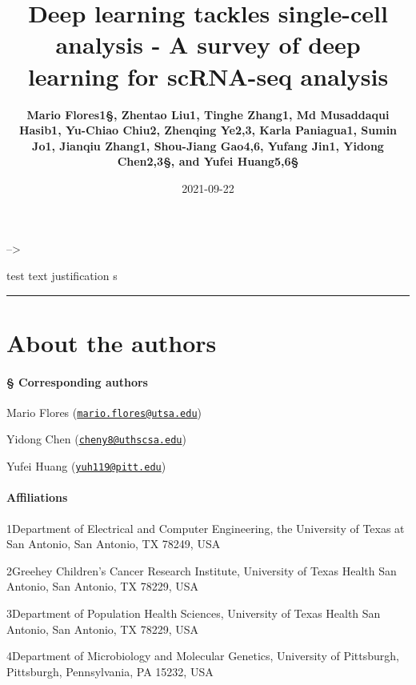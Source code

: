 \documentclass[
]{book}
\title{Deep learning tackles single-cell analysis - A survey of deep learning for scRNA-seq analysis}
\author{\textbf{Mario Flores1§, Zhentao Liu1, Tinghe Zhang1, Md Musaddaqui Hasib1, Yu-Chiao Chiu2, Zhenqing Ye2,3, Karla Paniagua1, Sumin Jo1, Jianqiu Zhang1, Shou-Jiang Gao4,6, Yufang Jin1, Yidong Chen2,3§, and Yufei Huang5,6§}}
\date{2021-09-22}
\begin{document}
\maketitle

{
\setcounter{tocdepth}{1}
\tableofcontents
}
--\textgreater{}

test text justification
s

\begin{center}\rule{0.5\linewidth}{0.5pt}\end{center}

\hypertarget{about-the-authors}{%
\chapter*{About the authors}\label{about-the-authors}}

\hypertarget{corresponding-authors}{%
\subsubsection*{\texorpdfstring{\textbf{§ Corresponding authors}}{§ Corresponding authors}}\label{corresponding-authors}}

Mario Flores (\href{mailto:mario.flores@utsa.edu}{\nolinkurl{mario.flores@utsa.edu}})

Yidong Chen (\href{mailto:cheny8@uthscsa.edu}{\nolinkurl{cheny8@uthscsa.edu}})

Yufei Huang (\href{mailto:yuh119@pitt.edu}{\nolinkurl{yuh119@pitt.edu}})

\hypertarget{affiliations}{%
\subsubsection*{\texorpdfstring{\textbf{Affiliations}}{Affiliations}}\label{affiliations}}

1Department of Electrical and Computer Engineering, the University of Texas at San Antonio, San Antonio, TX 78249, USA

2Greehey Children's Cancer Research Institute, University of Texas Health San Antonio, San Antonio, TX 78229, USA

3Department of Population Health Sciences, University of Texas Health San Antonio, San Antonio, TX 78229, USA

4Department of Microbiology and Molecular Genetics, University of Pittsburgh, Pittsburgh, Pennsylvania, PA 15232, USA
\end{document}
